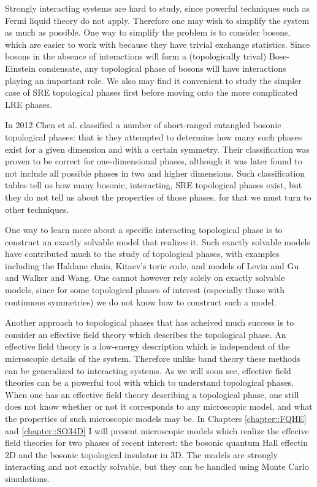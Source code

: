 Strongly interacting systems are hard to study, since powerful techniques such as Fermi liquid theory do not apply. Therefore one may wish to simplify the system as much as possible. 
One way to simplify the problem is to consider bosons, which are easier to work with because they have trivial exchange statistics.
Since bosons in the absence of interactions will form a (topologically trival) Bose-Einstein condensate, any topological phase of bosons will have interactions playing an important role.
We also may find it convenient to study the simpler case of SRE topological phases first before moving onto the more complicated LRE phases.

In 2012 Chen et al.\cite{WenScience,WenPRB} classified a number of short-ranged entangled bosonic topological phases: that is they attempted to determine how many such phases exist for a given dimension and with a certain symmetry. Their classification was proven to be correct for one-dimensional phases, although it was later found to not include all possible phases in two and higher dimensions\cite{LuVishwanath,KapustinThorngren}. Such classification tables tell us how many bosonic, interacting, SRE topological phases exist, but they do not tell us about the properties of those phases, for that we must turn to other techniques.

One way to learn more about a specific interacting topological phase is to construct an exactly solvable model that realizes it. Such exactly solvable models have contributed much to the study of topological phases, with examples including the Haldane chain, Kitaev's toric code\cite{KitaevToric}, and models of Levin and Gu\cite{LevinGu2012} and Walker and Wang\cite{WalkerWang,KeyserlingkBurnell2014}. One cannot however rely solely on exactly solvable models, since for some topological phases of interest (especially those with continuous symmetries) we do not know how to construct such a model.

Another approach to topological phases that has acheived much success is to consider an effective field theory which describes the topological phase. An effective field theory is a low-energy description which is independent of the microscopic details of the system. Therefore unlike band theory these methods can be generalized to interacting systems. As we will soon see, effective field theories can be a powerful tool with which to understand topological phases. When one has an effective field theory describing a topological phase, one still does not know whether or not it corresponds to any microscopic model, and what the properties of such microscopic models may be. In Chapters \ref{chapter::FQHE} and \ref{chapter::SO34D} I will present microscopic models which realize the effecive field theories for two phases of recent interest: the bosonic quantum Hall effectin 2D and the bosonic topological insulator in 3D. The models are strongly interacting and not exactly solvable, but they can be handled using Monte Carlo simulations.


